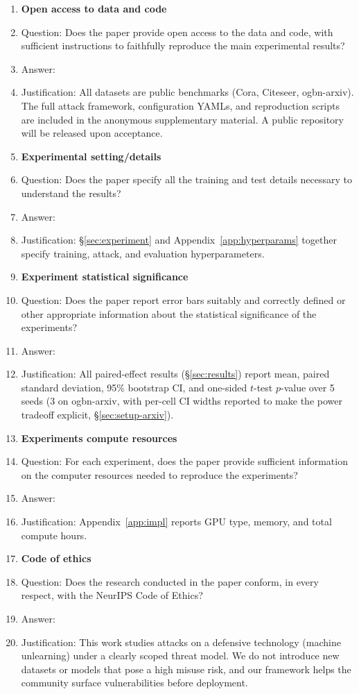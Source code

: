 \begin{enumerate}
\item {\bf Open access to data and code}
    \item[] Question: Does the paper provide open access to the data and code, with sufficient instructions to faithfully reproduce the main experimental results?
    \item[] Answer: \answerYes{}
    \item[] Justification: All datasets are public benchmarks (Cora, Citeseer, ogbn-arxiv). The full attack framework, configuration YAMLs, and reproduction scripts are included in the anonymous supplementary material. A public repository will be released upon acceptance.

\item {\bf Experimental setting/details}
    \item[] Question: Does the paper specify all the training and test details necessary to understand the results?
    \item[] Answer: \answerYes{}
    \item[] Justification: \S\ref{sec:experiment} and Appendix~\ref{app:hyperparams} together specify training, attack, and evaluation hyperparameters.

\item {\bf Experiment statistical significance}
    \item[] Question: Does the paper report error bars suitably and correctly defined or other appropriate information about the statistical significance of the experiments?
    \item[] Answer: \answerYes{}
    \item[] Justification: All paired-effect results (\S\ref{sec:results}) report mean, paired standard deviation, 95\% bootstrap CI, and one-sided $t$-test $p$-value over 5 seeds (3 on ogbn-arxiv, with per-cell CI widths reported to make the power tradeoff explicit, \S\ref{sec:setup-arxiv}).

\item {\bf Experiments compute resources}
    \item[] Question: For each experiment, does the paper provide sufficient information on the computer resources needed to reproduce the experiments?
    \item[] Answer: \answerYes{}
    \item[] Justification: Appendix~\ref{app:impl} reports GPU type, memory, and total compute hours.

\item {\bf Code of ethics}
    \item[] Question: Does the research conducted in the paper conform, in every respect, with the NeurIPS Code of Ethics?
    \item[] Answer: \answerYes{}
    \item[] Justification: This work studies attacks on a defensive technology (machine unlearning) under a clearly scoped threat model. We do not introduce new datasets or models that pose a high misuse risk, and our framework helps the community surface vulnerabilities before deployment.


\end{enumerate}
